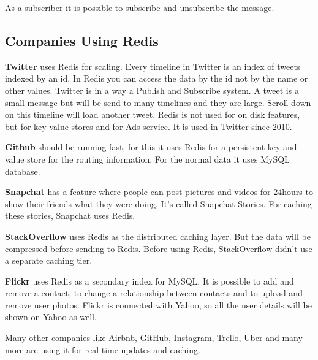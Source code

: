 As a subscriber it is possible to subscribe and unsubscribe the message.\cite{RedisLabsPS}

\subsection{Companies Using Redis}
\textbf{Twitter} uses Redis for scaling. Every timeline in Twitter is an index of tweets indexed by an id. In Redis you can access the data by the id not by the name or other values. Twitter is in a way a Publish and Subscribe system. A tweet is a small message but will be send to many timelines and they are large. Scroll down on this timeline will load another tweet.
Redis is not used for on disk features, but for key-value stores and for Ads service. It is used in Twitter since 2010.\cite{HighScalTwitter}

\textbf{Github} should be running fast, for this it uses Redis for a persistent key and value store for the routing information. For the normal data it uses MySQL database.\cite{Github}

\textbf{Snapchat} has a feature where people can post pictures and videos for 24hours to show their friends what they were doing. It’s called Snapchat Stories. For caching these stories, Snapchat uses Redis.\cite{RedisLabsUsing}

\textbf{StackOverflow} uses Redis as the distributed caching layer. But the data will be compressed before sending to Redis. Before using Redis, StackOverflow didn’t use a separate caching tier.\cite{HighScalSO}

\textbf{Flickr} uses Redis as a secondary index for MySQL. It is possible to add and remove a contact, to change a relationship between contacts and to upload and remove user photos. Flickr is connected with Yahoo, so all the user details will be shown on Yahoo as well.\cite{Cohen}

Many other companies like Airbnb, GitHub, Instagram, Trello, Uber and many more are using it for real time updates and caching.\cite{Techstacks}
